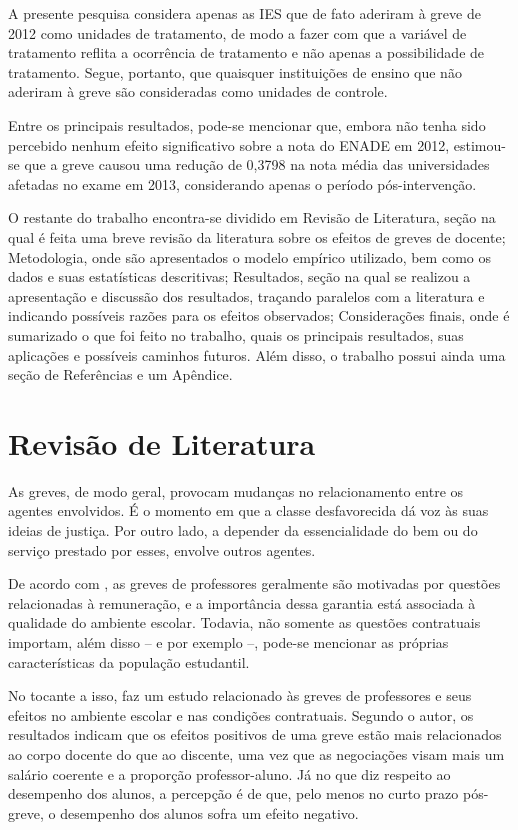 A presente pesquisa considera apenas as IES que de fato aderiram à greve de 2012 como unidades de tratamento, de modo a fazer com que a variável de tratamento reflita a ocorrência de tratamento e não apenas a possibilidade de tratamento. Segue, portanto, que quaisquer instituições de ensino que não aderiram à greve são consideradas como unidades de controle. 

Entre os principais resultados, pode-se mencionar que, embora não tenha sido percebido nenhum efeito significativo sobre a nota do ENADE em 2012, estimou-se que a greve causou uma redução de 0,3798 na nota média das universidades afetadas no exame em 2013, considerando apenas o período pós-intervenção.

O restante do trabalho encontra-se dividido em Revisão de Literatura, seção na qual é feita uma breve revisão da literatura sobre os efeitos de greves de docente; Metodologia, onde são apresentados o modelo empírico utilizado, bem como os dados e suas estatísticas descritivas; Resultados, seção na qual se realizou a apresentação e discussão dos resultados, traçando paralelos com a literatura e indicando possíveis razões para os efeitos observados; Considerações finais, onde é sumarizado o que foi feito no trabalho, quais os principais resultados, suas aplicações e possíveis caminhos futuros. Além disso, o trabalho possui ainda uma seção de Referências e um Apêndice.


\chapter{Revisão de Literatura}

As greves, de modo geral, provocam mudanças no relacionamento entre os agentes envolvidos. É o momento em que a classe desfavorecida dá voz às suas ideias de justiça. Por outro lado, a depender da essencialidade do bem ou do serviço prestado por esses, envolve outros agentes.

De acordo com , as greves de professores geralmente são motivadas por questões relacionadas à remuneração, e a importância dessa garantia está associada à qualidade do ambiente escolar. Todavia, não somente as questões contratuais importam, além disso – e por exemplo –, pode-se mencionar as próprias características da população estudantil.

No tocante a isso,  faz um estudo relacionado às greves de professores e seus efeitos no ambiente escolar e nas condições contratuais. Segundo o autor, os resultados indicam que os efeitos positivos de uma greve estão mais relacionados ao corpo docente do que ao discente, uma vez que as negociações visam mais um salário coerente e a proporção professor-aluno. Já no que diz respeito ao desempenho dos alunos, a percepção é de que, pelo menos no curto prazo pós-greve, o desempenho dos alunos sofra um efeito negativo.

